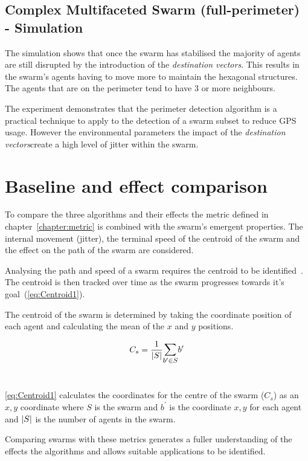 \subsection{Complex Multifaceted Swarm (full-perimeter) - Simulation}
The simulation shows that once the swarm has stabilised the majority of agents are still disrupted by the introduction of the \textit{destination vectors}. This results in the swarm's agents having to move more to maintain the hexagonal structures. The agents that are on the perimeter tend to have 3 or more neighbours. 

The experiment demonstrates that the perimeter detection algorithm is a practical technique to apply to the detection of a swarm subset to reduce GPS usage. However the environmental parameters the impact of the \textit{destination vectors}create a high level of jitter within the swarm.

\section{Baseline and effect comparison\label{section:compareBaselineAll1}}
To compare the three algorithms and their effects the metric defined in chapter~\ref{chapter:metric} is combined with the swarm's emergent properties. The internal movement (jitter), the terminal speed of the centroid of the swarm and the effect on the path of the swarm are considered. 

Analysing the path and speed of a swarm requires the centroid to be identified~\cite{HAY:08,VG:05,GP:02,GP:04,GP:04a,GP:05,GP:11}. The centroid is then tracked over time as the swarm progresses towards it's goal~(\autoref{eq:Centroid1}).

The centroid of the swarm is determined by taking the coordinate position of each agent and calculating the mean of the $x$ and $y$ positions.

\begin{equation}\label{eq:Centroid1}
C_s = \frac{1}{\card{S}}\mathlarger{\sum_{b' \in S}} b'
\end{equation}‎

\autoref{eq:Centroid1} calculates the coordinates for the centre of the swarm ($C_s$) as an $x,y$ coordinate where $S$ is the swarm and $b^{'}$ is the coordinate $x,y$ for each agent and $\vert{S}\vert$ is the number of agents in the swarm.

Comparing swarms with these metrics generates a fuller understanding of the effects the algorithms and allows suitable applications to be identified.

